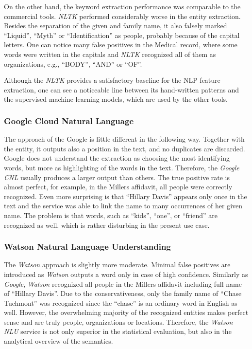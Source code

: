 \documentclass[
  digital, %
  notable,   %
  nolof,     %
  nolot,     %
]{fithesis3}
\begin{document}
On the other hand, the keyword extraction performance was comparable to the commercial tools.
\textit{NLTK} performed considerably worse in the entity extraction.
Besides the separation of the given and family name, it also falsely marked ``Liquid'', ``Myth'' or ``Identification'' as people, probably because of the capital letters.
One can notice many false positives in the Medical record, where some words were written in the capitals and \textit{NLTK} recognized all of them as organizations, e.g., ``BODY'', ``AND'' or ``OF''.

Although the \textit{NLTK} provides a satisfactory baseline for the NLP feature extraction, one can see a noticeable line between its hand-written patterns and the supervised machine learning models, which are used by the other tools.

\subsubsection{\textbf{Google Cloud Natural Language}}
The approach of the Google is little different in the following way.
Together with the entity, it outputs also a position in the text, and no duplicates are discarded.
Google does not understand the extraction as choosing the most identifying words, but more as highlighting of the words in the text.
Therefore, the \textit{Google CNL} usually produces a larger output than others.
The true positive rate is almost perfect, for example, in the Millers affidavit, all people were correctly recognized.
Even more surprising is that ``Hillary Davis'' appears only once in the text and the service was able to link the name to many occurrences of her given name.
The problem is that words, such as ``kids'', ``one'', or ``friend'' are recognized as well, which is rather disturbing in the present use case.

\subsubsection{\textbf{Watson Natural Language Understanding}}
The \textit{Watson} approach is slightly more moderate.
Minimal false positives are introduced as \textit{Watson} outputs a word only in case of high confidence.
Similarly as \textit{Google}, \textit{Watson} recognized all people in the Millers affidavit including full name of ``Hillary Davis''.
Due to the conservativeness, only the family name of ``Chase Tuchmont'' was recognized since the ``chase'' is an ordinary word in English as well.
However, the overwhelming majority of the recognized entities makes perfect sense and are truly people, organizations or locations.
Therefore, the \textit{Watson NLU} service is not only superior in the statistical evaluation, but also in the analytical overview of the semantics.
\end{document}

